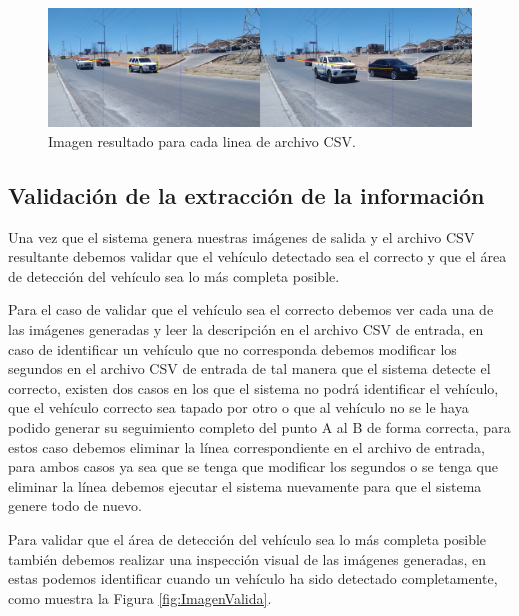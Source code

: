 \begin{figure}[H]
    \centering
    \includegraphics[width=1\textwidth]{Metodologia/imgs/Completo.jpg}
    \caption{Imagen resultado para cada linea de archivo CSV.}
    \label{fig:Completo}
\end{figure}


\subsection{Validación de la extracción de la información}

Una vez que el sistema genera nuestras imágenes de salida y el archivo CSV resultante debemos validar que el vehículo detectado sea el correcto y que el área de detección del vehículo sea lo más completa posible.

Para el caso de validar que el vehículo sea el correcto debemos ver cada una de las imágenes generadas y leer la descripción en el archivo CSV de entrada, en caso de identificar un vehículo que no corresponda debemos modificar los segundos en el archivo CSV de entrada de tal manera que el sistema detecte el correcto, existen dos casos en los que el sistema no podrá identificar el vehículo, que el vehículo correcto sea tapado por otro o que al vehículo no se le haya podido generar su seguimiento completo del punto A al B de forma correcta, para estos caso debemos eliminar la línea correspondiente en el archivo de entrada, para ambos casos ya sea que se tenga que modificar los segundos o se tenga que eliminar la línea debemos ejecutar el sistema nuevamente para que el sistema genere todo de nuevo.

Para validar que el área de detección del vehículo sea lo más completa posible también debemos realizar una inspección visual de las imágenes generadas, en estas podemos identificar cuando un vehículo ha sido detectado completamente, como muestra la Figura \ref{fig:ImagenValida}.

